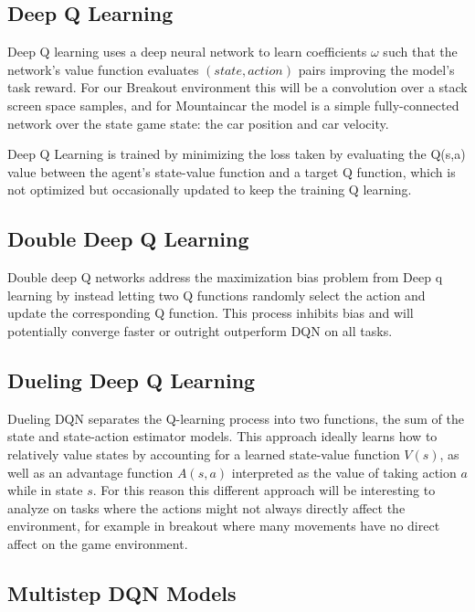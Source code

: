 \documentclass[conference]{IEEEtran}
\begin{document}
\subsection{Deep Q Learning}
Deep Q learning uses a deep neural network to learn coefficients $\omega$ such that the network's value function evaluates $(state, action)$ pairs improving the model's task reward. For our Breakout environment this will be a convolution over a stack screen space samples, and for Mountaincar the model is a simple fully-connected network over the state game state: the car position and car velocity.

Deep Q Learning is trained by minimizing the loss taken by evaluating the Q(s,a) value between the agent's state-value function and a target Q function, which is not optimized but occasionally updated to keep the training Q learning.

\subsection{Double Deep Q Learning}
Double deep Q networks address the maximization bias problem from Deep q learning by instead letting two Q functions randomly select the action and update the corresponding Q function. This process inhibits bias and will potentially converge faster or outright outperform DQN on all tasks.

\subsection{Dueling Deep Q Learning}
Dueling DQN separates the Q-learning process into two functions, the sum of the state and state-action estimator models. This approach ideally learns how to relatively value states by accounting for a learned state-value function $V(s)$, as well as an advantage function $A(s,a)$ interpreted as the value of taking action $a$ while in state $s$. For this reason this different approach will be interesting to analyze on tasks where the actions might not always directly affect the environment, for example in breakout where many movements have no direct affect on the game environment.

\subsection{Multistep DQN Models}
\end{document}
